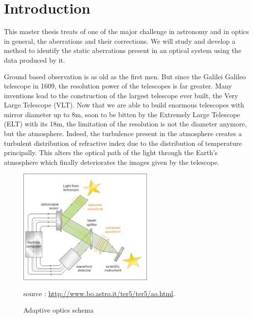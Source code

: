
\chapter*{Introduction} %
\label{Introduction} %


\newcommand{\keyword}[1]{\textbf{#1}}
\newcommand{\tabhead}[1]{\textbf{#1}}
\newcommand{\code}[1]{\texttt{#1}}
\newcommand{\file}[1]{\texttt{\bfseries#1}}
\newcommand{\option}[1]{\texttt{\itshape#1}}


This master thesis treats of one of the major challenge in astronomy and in optics in general, the aberrations and their corrections. We will study and develop a method to identify the static aberrations present in an  optical system using the data produced by it.

\vspace{1cm}


Ground based observation is as old as the first men. But since the Galilei Galileo telescope in 1609, the resolution power of the telescopes is far greater. Many inventions lead to the construction of the largest telescope ever built, the Very Large Telescope (VLT). Now that we are able to build enormous telescopes with mirror diameter up to 8m, soon to be bitten by the Extremely Large Telescope (ELT) with its 18m, the limitation of the resolution is not the diameter anymore, but the atmosphere. Indeed, the turbulence present in the atmosphere creates a turbulent distribution of refractive index due to the distribution of temperature principally. This alters the optical path of the light through the Earth's atmosphere which finally deteriorates the images given by the telescope.

\begin{figure}
\begin{center}
\includegraphics[width=0.6\textwidth,angle=0]{Figures/ao_scheme.jpg}
\caption{Adaptive optics schema}
source : \url{http://www.bo.astro.it/ter5/ter5/ao.html}.
\label{fig:ao_scheme}
\end{center}
\end{figure}

